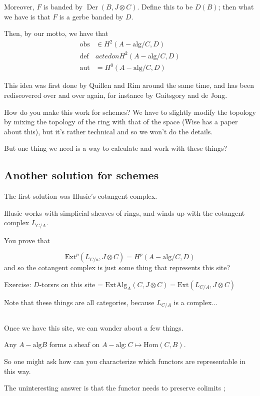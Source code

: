 \documentclass{amsart}
\theoremstyle{definition}
\DeclareMathOperator{\Der}{Der}
\newcommand{\alg}{\text{alg}}
\newcommand{\Hom}{\text{Hom}}
\begin{document}
Moreover, $F$ is banded by $\Der(B,J\otimes C)$.  Define this to be $D(B)$; then what we have is that $F$ is a gerbe banded by $D$.

Then, by our motto, we have that
\begin{align*} 
\text{obs} &\in H^2(A-\text{alg}/C, D) \\
\text{def} &acted on H^2(A-\text{alg}/C, D) \\
\text{aut} &= H^0(A-\alg/C, D) 
\end{align*}

This idea was first done by Quillen and Rim around the same time, and has been rediscovered over and over again, for instance by Gaitsgory  and de Jong.

How do you make this work for schemes?  We have to slightly modify the topology by mixing the topology of the ring with that of the space (Wise has a paper about this), but it's rather technical and so we won't do the details.

But one thing we need is a way to calculate and work with these things?

\subsection{Another solution for schemes}
The first solution was Illusie's cotangent complex.

Illusie works with simplicial sheaves of rings, and winds up with the cotangent complex $L_{C/A}$.

You prove that

$$\text{Ext}^p(L_{C/a}, J\otimes C)=H^p(A-\text{alg}/C, D)$$
and so the cotangent complex is just some thing that represents this site?


Exercise:
$D$-torsrs on this site = $\text{ExtAlg}_A(C, J\otimes C)=\text{Ext}(L_{C/A}, J\otimes C)$

Note that these things are all categories, because $L_{C/A}$ is a complex...


\subsection{}
Once we have this site, we can wonder about a few things. 

Any $A-\alg B$ forms a sheaf on $A-\alg: C\mapsto \Hom(C,B)$.

So one might ask how can you characterize which functors are representable in this way.

The uninteresting answer is that the functor needs to preserve colimits ;
\end{document}
